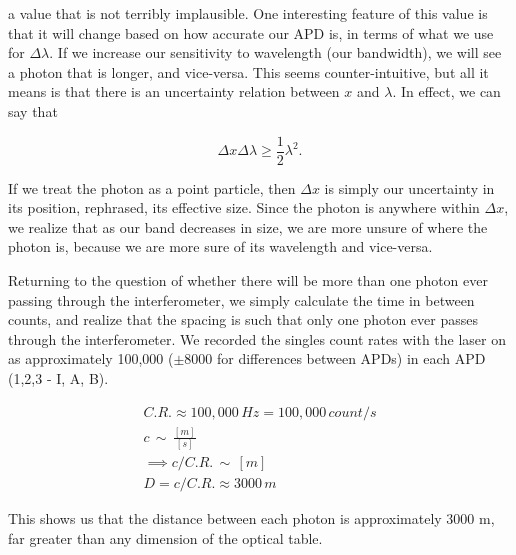 \documentclass{article}
\begin{document}
a value that is not terribly implausible.  One interesting feature of this value is that it will change based on how accurate our APD is, in terms of what we use for $\Delta \lambda$.  If we increase our sensitivity to wavelength (our bandwidth), we will see a photon that is longer, and vice-versa.  This seems counter-intuitive, but all it means is that there is an uncertainty relation between $x$ and $\lambda$.  In effect, we can say that

\begin{equation}
	\Delta x \Delta \lambda \geq \frac{1}{2} \lambda^2.
\end{equation}

If we treat the photon as a point particle, then $\Delta x$ is simply our uncertainty in its position, rephrased, its effective size.  Since the photon is anywhere within $\Delta x$, we realize that as our band decreases in size, we are more unsure of where the photon is, because we are more sure of its wavelength and vice-versa.

\hspace{.5cm}

Returning to the question of whether there will be more than one photon ever passing through the interferometer, we simply calculate the time in between counts, and realize that the spacing is such that only one photon ever passes through the interferometer.  We recorded the singles count rates with the laser on as approximately 100,000 ($\pm 8000$ for differences between APDs) in each APD (1,2,3 - I, A, B).

\begin{gather*}
	C.R. \approx 100,000 \, H\!z = 100,000 \, count/s \\
	c \, \sim \, \frac{[m]}{[s]} \\
	\implies c/C.R. \, \sim \, [m] \\
	D = c/C.R. \approx 3000 \, m 
\end{gather*}

This shows us that the distance between each photon is approximately 3000 m, far greater than any dimension of the optical table.
\end{document}
